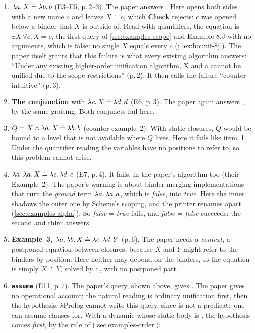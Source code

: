 {\begin{tutorial}
\begin{enumerate}
  \item \textbf{$\lambda a.\,X\doteq\lambda b.\,b$} (E3--E5, p.\,2--3). The paper answers . Here
     opens both sides with a new name $c$ and leaves $X\doteq c$, which \textbf{Check}
    rejects: $c$ was opened below a binder that $X$ is outside of. Read with quantifiers, the equation
    is $\exists X\,\forall c.\,X=c$, the first query of \cref{sec:examples-scope} and Example 8.J
    with no arguments, which is false: no single $X$ equals every $c$ (; \cref{ex:hounif-8j}).
    The paper itself grants that this failure is what every existing algorithm answers:
    \enquote{Under any existing higher-order unification algorithm, X and a cannot be unified due to
    the scope restrictions} (p.\,2). It then calls the failure \enquote{counter-intuitive} (p.\,3).
  \item \textbf{The conjunction} with $\lambda c.\,X\doteq\lambda d.\,d$ (E6, p.\,3). The paper again answers
    , by the same grafting. Both conjuncts fail here.
  \item \textbf{$Q=X\wedge\lambda a.\,X\doteq\lambda b.\,b$} (counter-example~2). With static closures,
    $Q$ would be bound to a level that is not available where $Q$ lives. Here it fails like
    item~1. Under the quantifier reading the variables have no positions to refer to, so this problem
    cannot arise.
  \item \textbf{$\lambda a.\,\lambda a.\,X\doteq\lambda c.\,\lambda d.\,c$} (E7, p.\,4). It fails, in the paper's
    algorithm too (their Example~2). The paper's warning is about binder-merging implementations that
    turn the \emph{ground} term $\lambda a.\,\lambda a.\,a$, which is \emph{false}, into \emph{true}. Here
    the inner  shadows the outer one by Scheme's scoping, and the printer renames apart
    (\cref{sec:examples-alpha}). So \emph{false} = \emph{true} fails, and \emph{false} = \emph{false}
    succeeds: the second and third answers.
  \item \textbf{Example~3, $\lambda a.\,\lambda b.\,X\doteq\lambda c.\,\lambda d.\,Y$} (p.\,6). The paper needs a
    \emph{context}, a postponed equation between closures, because $X$ and $Y$ might refer to the
    binders by position. Here neither may depend on the binders, so the equation is simply
    $X\doteq Y$, solved by : , with no postponed part.
  \item \textbf{\texttt{assume}} (E11, p.\,7). The paper's query, shown above, gives
    . The paper gives no operational account; the natural reading is ordinary unification first, then the
    hypothesis. λProlog cannot write this query, since \lp{=} is not a
    predicate one can assume clauses for. With a dynamic  whose static body is , the
    hypothesis comes \emph{first}, by the rule of  (\cref{sec:examples-order}):
    .
\end{enumerate}
\end{tutorial}

}
